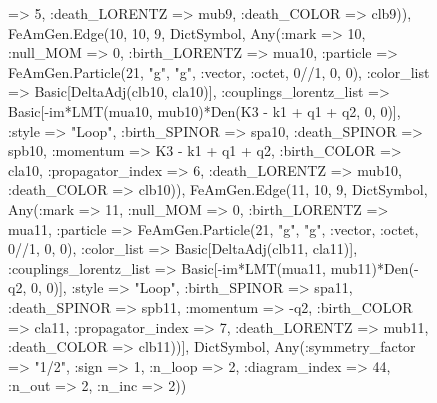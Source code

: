 \documentclass{revtex4}
\begin{document}
\begin{figure}[!htb]
\begin{center}
{=> 5, :death_LORENTZ => mub9, :death_COLOR => clb9)), FeAmGen.Edge(10, 10, 9, Dict{Symbol, Any}(:mark => 10, :null_MOM => 0, :birth_LORENTZ => mua10, :particle => FeAmGen.Particle(21, "g", "g", :vector, :octet, 0//1, 0, 0), :color_list => Basic[DeltaAdj(clb10, cla10)], :couplings_lorentz_list => Basic[-im*LMT(mua10, mub10)*Den(K3 - k1 + q1 + q2, 0, 0)], :style => "Loop", :birth_SPINOR => spa10, :death_SPINOR => spb10, :momentum => K3 - k1 + q1 + q2, :birth_COLOR => cla10, :propagator_index => 6, :death_LORENTZ => mub10, :death_COLOR => clb10)), FeAmGen.Edge(11, 10, 9, Dict{Symbol, Any}(:mark => 11, :null_MOM => 0, :birth_LORENTZ => mua11, :particle => FeAmGen.Particle(21, "g", "g", :vector, :octet, 0//1, 0, 0), :color_list => Basic[DeltaAdj(clb11, cla11)], :couplings_lorentz_list => Basic[-im*LMT(mua11, mub11)*Den(-q2, 0, 0)], :style => "Loop", :birth_SPINOR => spa11, :death_SPINOR => spb11, :momentum => -q2, :birth_COLOR => cla11, :propagator_index => 7, :death_LORENTZ => mub11, :death_COLOR => clb11))], Dict{Symbol, Any}(:symmetry_factor => "1/2", :sign => 1, :n_loop => 2, :diagram_index => 44, :n_out => 2, :n_inc => 2)) 
}
\end{center}
\end{figure}
\end{document}
